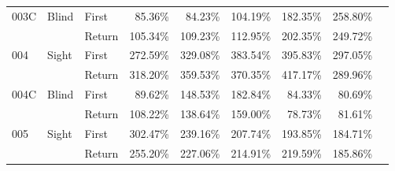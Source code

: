 \begin{table}[!htb]
\begin{tabular}{lllrrrrrr}
003C & Blind & First &   85.36\% &   84.23\% &                                              104.19\% &                                               182.35\% &   258.80\% \\
    &       & Return &  105.34\% &  109.23\% &                                              112.95\% &                                               202.35\% &   249.72\% \\
004 & Sight & First &  272.59\% &  329.08\% &                                              383.54\% &                                               395.83\% &   297.05\% \\
    &       & Return &  318.20\% &  359.53\% &                                              370.35\% &                                               417.17\% &   289.96\% \\
004C & Blind & First &   89.62\% &  148.53\% &                                              182.84\% &                                                84.33\% &    80.69\% \\
    &       & Return &  108.22\% &  138.64\% &                                              159.00\% &                                                78.73\% &    81.61\% \\
005 & Sight & First &  302.47\% &  239.16\% &                                              207.74\% &                                               193.85\% &   184.71\% \\
    &       & Return &  255.20\% &  227.06\% &                                              214.91\% &                                               219.59\% &   185.86\% \\
\bottomrule
\end{tabular}
\end{table}

